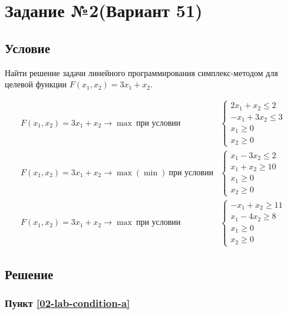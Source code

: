 \section{Задание №2(Вариант 51)}\label{02-lab}

\subsection{Условие}

Найти решение задачи линейного программирования симплекс-методом для целевой функции $F(x_1, x_2) = 3x_1 + x_2$.

\begin{align}
    F(x_1, x_2) = 3x_1 + x_2 \to \max\ \text{при условии}       &
    \begin{cases}
        2x_1 + x_2 \leq 2  \\
        -x_1 + 3x_2 \leq 3 \\
        x_1 \geq 0         \\
        x_2 \geq 0
    \end{cases}\tag{А}\label{02-lab-condition-a}                  \\
    F(x_1, x_2) = 3x_1 + x_2 \to \max(\min)\ \text{при условии} &
    \begin{cases}
        x_1 - 3x_2 \leq 2 \\
        x_1 + x_2 \geq 10 \\
        x_1 \geq 0        \\
        x_2 \geq 0
    \end{cases}\tag{Б}\label{02-lab-condition-b}                  \\
    F(x_1, x_2) = 3x_1 + x_2 \to \max\ \text{при условии}       &
    \begin{cases}
        -x_1 + x_2 \geq 11 \\
        x_1 - 4x_2 \geq 8  \\
        x_1 \geq 0         \\
        x_2 \geq 0
    \end{cases}\tag{В}
    \label{02-lab-condition-c}
\end{align}

\subsection{Решение}\label{02-lab-solution}
\subsubsection{Пункт \ref{02-lab-condition-a}}\label{02-lab-a}

